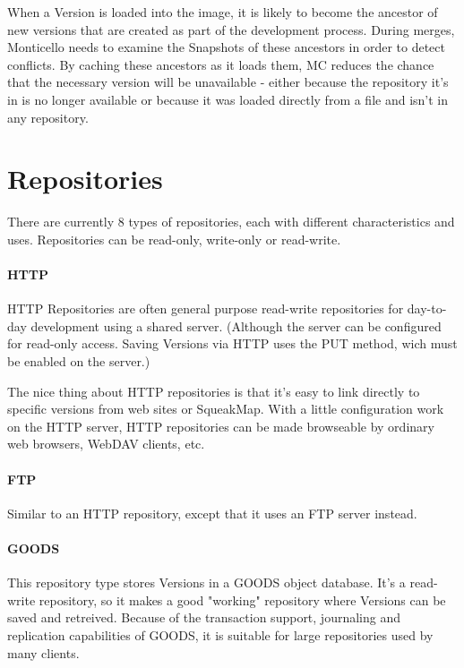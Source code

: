 When a Version is loaded into the image, it is likely to become the ancestor of new versions that are created as part of the development process. During merges, Monticello needs to examine the Snapshots of these ancestors in order to detect conflicts. By caching these ancestors as it loads them, MC reduces the chance that the necessary version will be unavailable - either because the repository it's in is no longer available or because it was loaded directly from a file and isn't in any repository.



\section{Repositories}

There are currently 8 types of repositories, each with different characteristics and uses. Repositories can be read-only, write-only or read-write.

\paragraph{HTTP}

HTTP Repositories are often general purpose read-write repositories for day-to-day development using a shared server. (Although the server can be configured for read-only access. Saving Versions via HTTP uses the PUT method, wich must be enabled on the server.)

The nice thing about HTTP repositories is that it's easy to link directly to specific versions from web sites or SqueakMap. With a little configuration work on the HTTP server, HTTP repositories can be made browseable by ordinary web browsers, WebDAV clients, etc.

\paragraph{FTP}

Similar to an HTTP repository, except that it uses an FTP server instead.

\paragraph{GOODS}

This repository type stores Versions in a GOODS object database. It's a read-write repository, so it makes a good "working" repository where Versions can be saved and retreived. Because of the transaction support, journaling and replication capabilities of GOODS, it is suitable for large repositories used by many clients.

